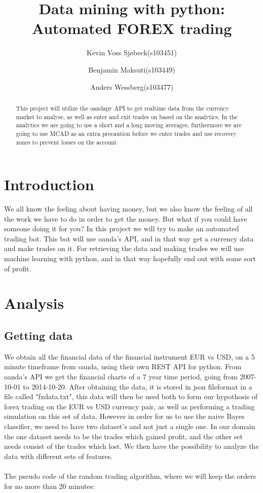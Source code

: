 \documentclass[10pt]{IEEEtran}
\title{Data mining with python: \\Automated FOREX trading}
\author{
	Kevin Voss Sjøbeck(s103451)\\
	\and
	Benjamin Maksuti(s103449)\\
	\and
	Anders Wessberg(s103477)
}
\begin{document}
\maketitle

\begin{abstract}
This project will utilize the oandapy API to get realtime data from the currency market to analyse, as well as enter and exit trades on based on the analytics. In the analytics we are going to use a short and a long moving averages, furthermore we are going to use MCAD as an extra precaution before we enter trades and use recovery zones to prevent losses on the account
\end{abstract}

\section{Introduction}
We all know the feeling about having money, but we also know the feeling of all the work we have to do in order to get the money.
But what if you could have someone doing it for you? In this project we will try to make an automated trading bot. This bot will use oanda's API, and in that way get a currency data and make trades on it.
For retrieving the data and making trades we will use machine learning with python, and in that way hopefully end out with some sort of profit.


\section{Analysis}

\subsection{Getting data}
We obtain all the financial data of the financial instrument EUR vs USD, on a 5 minute timeframe from oanda, using their own REST API for python. From oanda's API we get the financial charts of a 7 year time period, going from 2007-10-01 to 2014-10-20. After obtaining the data, it is stored in json fileformat in a file called "fxdata.txt", this data will then be used both to form our hypothosis of forex trading on the EUR vs USD currency pair, as well as performing a trading simulation on this set of data. However in order for us to use the naive Bayes classifier, we need to have two dataset's and not just a single one. In our domain the one dataset needs to be the trades which gained profit, and the other set needs consist of the trades which lost. We then have the possibility to analyze the data with different sets of features.\\
\\
The pseudo code of the random trading algorithm, where we will keep the orders for no more than 20 minutes:
\end{document}
